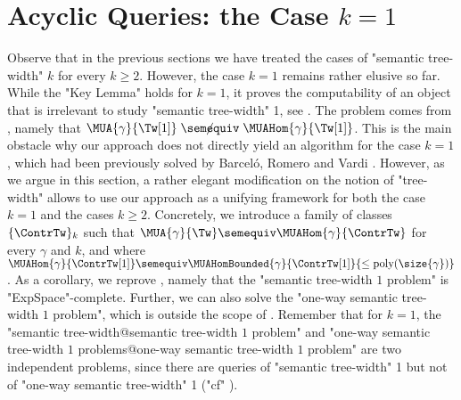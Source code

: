 \section{\AP{}Acyclic Queries: the Case $k=1$}
\label{sec:acyclic-queries}



Observe that in the previous sections we have treated the cases of "semantic tree-width" $k$ for every $k\geq 2$. However, the case $k=1$ remains rather elusive so far. 
While the "Key Lemma" holds for $k=1$, it proves the computability of an object that
is irrelevant to study "semantic tree-width" 1, see . 
The problem comes from , namely that
$\MUA{\gamma}{\Tw[1]} \centernot{\semequiv} \MUAHom{\gamma}{\Tw[1]}$.
This is the main obstacle why our approach does not directly yield an algorithm for the case $k=1$, which had been previously solved by Barceló, Romero and Vardi \cite{BarceloRomeroVardi2016SemanticAcyclicity}. 
However, as we argue in this section, a rather elegant modification on the notion of "tree-width" allows to use our approach as a unifying framework for both the case $k=1$ and the cases
$k \geq 2$. 
Concretely, we introduce a family of classes $\set{\ContrTw}_k$ such that 
$\MUA{\gamma}{\Tw} \semequiv \MUAHom{\gamma}{\ContrTw}$ for every $\gamma$ and $k$, and where 
$\MUAHom{\gamma}{\ContrTw[1]} \semequiv \MUAHomBounded{\gamma}{\ContrTw[1]}{\leq\poly(\size{\gamma})}$.
As a corollary, we reprove \cite[Theorem~6.1]{BarceloRomeroVardi2016SemanticAcyclicity}, namely that the "semantic tree-width $1$ problem" is "ExpSpace"-complete. Further, we can also solve the "one-way semantic tree-width $1$ problem", which is outside the scope of \cite{BarceloRomeroVardi2016SemanticAcyclicity}. 
Remember that for $k=1$, the "semantic tree-width@semantic tree-width $1$ problem" and "one-way semantic tree-width $1$ problems@one-way semantic tree-width $1$ problem" are two independent problems, since there are queries of "semantic tree-width" 1 but not of "one-way semantic tree-width" 1 ("cf" ).




